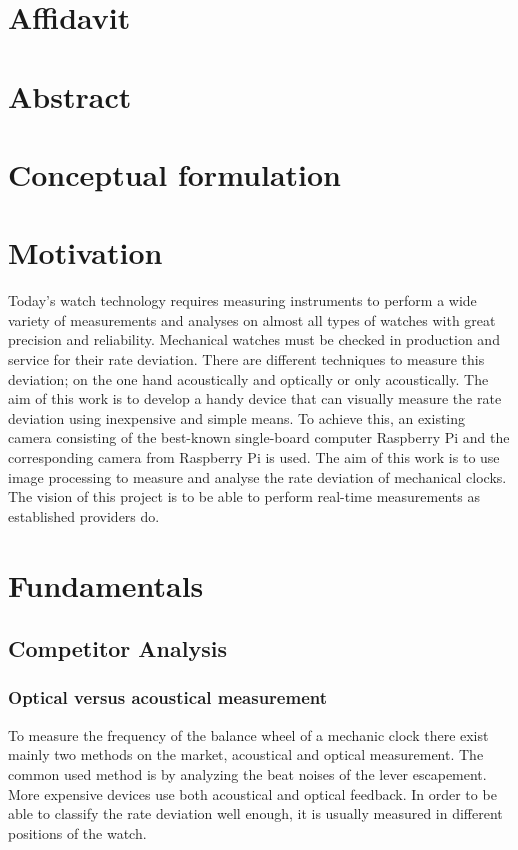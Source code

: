 \documentclass[12pt, a4paper]{report}
\begin{document}
    \chapter*{Affidavit}
     
         
    \chapter*{Abstract}

\pagebreak
    \setcounter{secnumdepth}{5} 
    \setcounter{tocdepth}{5} 
    \tableofcontents
    \pagebreak
    
    \chapter{Conceptual formulation}
    
    \chapter{Motivation}
    Today's watch technology requires measuring instruments to perform a wide variety of measurements and analyses on almost all types of watches with great precision and reliability.
    Mechanical watches must be checked in production and service for their rate deviation.
    There are different techniques to measure this deviation; on the one hand acoustically and optically or only acoustically.
    The aim of this work is to develop a handy device that can visually measure the rate deviation using inexpensive and simple means.
    To achieve this, an existing camera consisting of the best-known single-board computer Raspberry Pi and the corresponding camera from Raspberry Pi is used.
    The aim of this work is to use image processing to measure and analyse the rate deviation of mechanical clocks.
    The vision of this project is to be able to perform real-time measurements as established providers do.
    
    \chapter{Fundamentals}
    \section {Competitor Analysis}
    \subsection{Optical versus acoustical measurement}
    To measure the frequency of the balance wheel of a mechanic clock there exist mainly two methods on the market, acoustical and optical measurement. The common used method is by analyzing the beat noises of the lever escapement. More expensive devices use both acoustical and optical feedback. In order to be able to classify the rate deviation well enough, it is usually measured in different positions of the watch.
    
\end{document}
